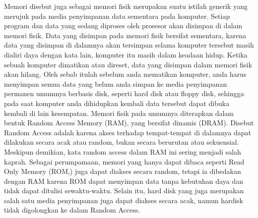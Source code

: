 \documentclass{article}
\begin{document}
Memori disebut juga sebagai memori fisik merupakan suatu istilah generik yang merujuk pada media penyimpanan data sementara pada komputer. Setiap program dan data yang sedang diproses oleh prosesor akan disimpan di dalam memori fisik. Data yang disimpan pada memori fisik bersifat sementara, karena data yang disimpan di dalamnya akan tersimpan selama komputer tersebut masih dialiri daya dengan kata lain, komputer itu masih dalam keadaan hidup. Ketika sebuah komputer dimatikan atau direset, data yang disimpan dalam memori fisik akan hilang. Oleh sebab itulah sebelum anda mematikan komputer, anda harus menyimpan semua data yang belum anda simpan ke media penyimpanan permanen umumnya berbasis disk, seperti hard disk atau floppy disk, sehingga pada saat komputer anda dihidupkan kembali data tersebut dapat dibuka kembali di lain kesempatan. Memori fisik pada umumnya diterapkan dalam bentuk Random Access Memory (RAM), yang bersifat dinamis (DRAM). Disebut Random Access adalah karena akses terhadap tempat-tempat di dalamnya dapat dilakukan secara acak atau random, bukan secara berurutan atau sekuensial. Meskipun demikian, kata random access dalam RAM ini sering menjadi salah kaprah. Sebagai perumpamaan, memori yang hanya dapat dibaca seperti Read Only Memory (ROM,) juga dapat diakses secara random, tetapi ia dibedakan dengan RAM karena ROM dapat menyimpan data tanpa kebutuhan daya dan tidak dapat ditulisi sewaktu-waktu. Selain itu, hard disk yang juga merupakan salah satu media penyimpanan juga dapat diakses secara acak, namun hardisk tidak digolongkan ke dalam Random Access.
\end{document}
